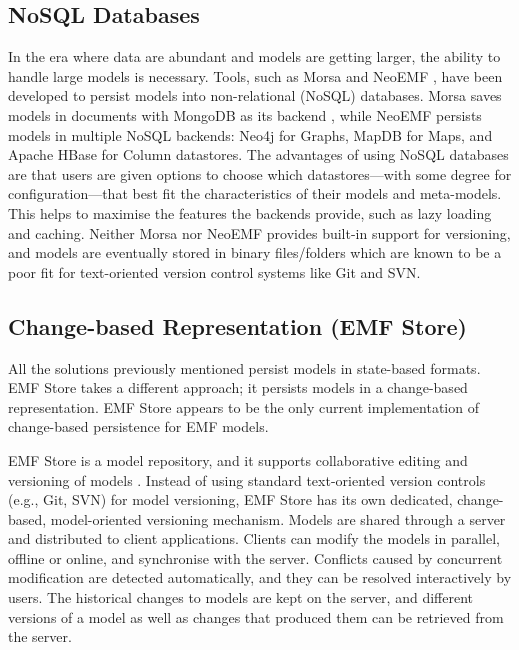 \subsection{NoSQL Databases}
\label{sec:NoSQL Databases}
In the era where data are abundant and models are getting larger, the ability to handle large models is necessary. Tools, such as Morsa \cite{DBLP:conf/models/Espinazo-PaganCM11} and NeoEMF \cite{daniel2016neoemf}, have been developed to persist models into non-relational (NoSQL) databases. Morsa saves models in documents with MongoDB as its backend \cite{mongodb}, while NeoEMF persists models in multiple NoSQL backends: Neo4j \cite{neo4j2019neo4j} for Graphs, MapDB \cite{mapdb2019mapdb} for Maps, and Apache HBase \cite{apache2019hbase} for Column datastores. The advantages of using NoSQL databases are that users are given options to choose which datastores—with some degree for configuration—that best fit the characteristics of their models and meta-models. This helps to maximise the features the backends provide, such as lazy loading and caching. Neither Morsa nor NeoEMF provides built-in support for versioning, and models are eventually stored in binary files/folders which are known to be a poor fit for text-oriented version control systems like Git and SVN.

\subsection{Change-based Representation (EMF Store)}
\label{sec:change_based_representation}
All the solutions previously mentioned persist models in state-based formats. EMF Store \cite{koegel2010emfstore} takes a different approach; it persists models in a change-based representation. EMF Store appears to be the only current implementation of change-based persistence for EMF models.

EMF Store is a model repository, and it supports collaborative editing and versioning of models \cite{emfstore2019what}. Instead of using standard text-oriented version controls (e.g., Git, SVN) for model versioning, EMF Store has its own dedicated, change-based, model-oriented versioning mechanism. Models are shared through a server and distributed to client applications. Clients can modify the models in parallel, offline or online, and synchronise with the server. Conflicts caused by concurrent modification are detected automatically, and they can be resolved interactively by users. The historical changes to models are kept on the server, and different versions of a model as well as changes that produced them can be retrieved from the server.

